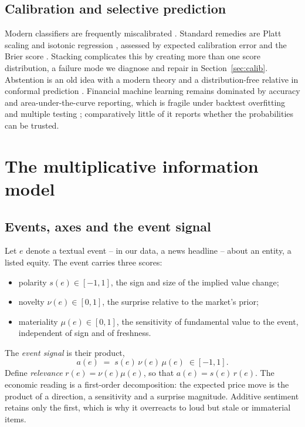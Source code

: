\subsection{Calibration and selective prediction}

Modern classifiers are frequently miscalibrated \citep{guo2017}. Standard
remedies are Platt scaling \citep{platt1999} and isotonic regression
\citep{zadrozny2002}, assessed by expected calibration error and the Brier score
\citep{brier1950}. Stacking \citep{wolpert1992} complicates this by creating more
than one score distribution, a failure mode we diagnose and repair in
Section~\ref{sec:calib}. Abstention is an old idea \citep{chow1970} with a modern
theory \citep{geifman2017,elyaniv2010} and a distribution-free relative in
conformal prediction \citep{angelopoulos2023}. Financial machine learning remains
dominated by accuracy and area-under-the-curve reporting, which is fragile under
backtest overfitting \citep{bailey2017} and multiple testing
\citep{harvey2016,romano2005}; comparatively little of it reports whether the
probabilities can be trusted.

\section{The multiplicative information model}\label{sec:model}

\subsection{Events, axes and the event signal}

Let $e$ denote a textual event -- in our data, a news headline -- about an entity,
a listed equity. The event carries three scores:
\begin{itemize}
\item polarity $s(e)\in[-1,1]$, the sign and size of the implied value change;
\item novelty $\nu(e)\in[0,1]$, the surprise relative to the market's prior;
\item materiality $\mu(e)\in[0,1]$, the sensitivity of fundamental value to the
  event, independent of sign and of freshness.
\end{itemize}
The \emph{event signal} is their product,
\begin{equation}\label{eq:signal}
a(e)\;=\;s(e)\,\nu(e)\,\mu(e)\;\in[-1,1].
\end{equation}
Define \emph{relevance} $r(e)=\nu(e)\mu(e)$, so that $a(e)=s(e)\,r(e)$. The
economic reading is a first-order decomposition: the expected price move is the
product of a direction, a sensitivity and a surprise magnitude. Additive
sentiment retains only the first, which is why it overreacts to loud but stale or
immaterial items.

